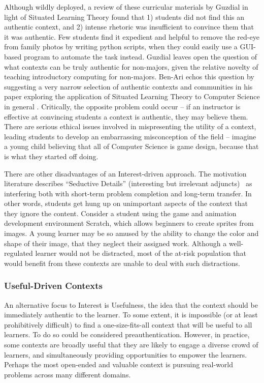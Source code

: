 Although wildly deployed, a review of these curricular materials by Guzdial \cite{guzdial2006imagineering} in light of Situated Learning Theory found that 1) students did not find this an authentic context, and 2) intense rhetoric was insufficient to convince them that it was authentic. 
Few students find it expedient and helpful to remove the red-eye from family photos by writing python scripts, when they could easily use a GUI-based program to automate the task instead.
Guzdial leaves open the question of what contexts can be truly authentic for non-majors, given the relative novelty of teaching introductory computing for non-majors.
Ben-Ari echos this question by suggesting a very narrow selection of authentic contexts and communities in his paper exploring the application of Situated Learning Theory to Computer Science in general \cite{ben2004situated}.
Critically, the opposite problem could occur -- if an instructor is effective at convincing students a context is authentic, they may believe them.
There are serious ethical issues involved in mispresenting the utility of a context, leading students to develop an embarrassing misconception of the field -- imagine a young child believing that all of Computer Science is game design, because that is what they started off doing.

There are other disadvantages of an Interest-driven approach.
The motivation literature describes ``Seductive Details'' (interesting but irrelevant adjuncts)~\cite{harp1998seductive} as interfering both with short-term problem completion and long-term transfer.
In other words, students get hung up on unimportant aspects of the context that they ignore the content.
Consider a student using the game and animation development environment Scratch, which allows beginners to create sprites from images.
A young learner may be so amused by the ability to change the color and shape of their image, that they neglect their assigned work.
Although a well-regulated learner would not be distracted, most of the at-risk population that would benefit from these contexts are unable to deal with such distractions.

\subsubsection{Useful-Driven Contexts}

An alternative focus to Interest is Usefulness, the idea that the context should be immediately authentic to the learner.
To some extent, it is impossible (or at least prohibitively difficult) to find a one-size-fits-all context that will be useful to all learners.
To do so could be considered preauthentication.
However, in practice, some contexts are broadly useful that they are likely to engage a diverse crowd of learners, and simultaneously providing opportunities to empower the learners.
Perhaps the most open-ended and valuable context is pursuing real-world problems across many different domains.

